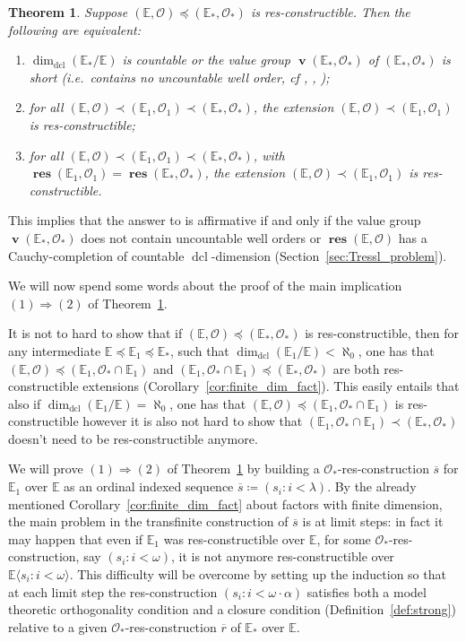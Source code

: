 \documentclass{amsart}
\theoremstyle{remark}
\theoremstyle{definition}
\theoremstyle{plain}
\newcommand{\bE}{\mathbb E}
\newcommand{\cO}{\mathcal O}
\DeclareMathOperator{\val}{\mathbf{v}}
\DeclareMathOperator{\res}{\mathbf{res}}
\DeclareMathOperator{\dcl}{\mathrm{dcl}}
\theoremstyle{plain}
\newcounter{introthmcounter}
\newtheorem{thmA}{Theorem}[introthmcounter]
\begin{document}
\begin{thmA}\label{introthm:Main}
    Suppose $(\bE, \cO)\preceq (\bE_*, \cO_*)$ is res-constructible. Then the following are equivalent:
    \begin{enumerate}
        \item $\dim_{\dcl}(\bE_*/\bE)$ is countable or the value group $\val(\bE_*, \cO_*)$ of $(\bE_*, \cO_*)$ is short (i.e.\ contains no uncountable well order, cf \cite[p.~88]{rosenstein1982linear}, \cite{aschenbrenner2025analytic}, \cite{aschenbrenner2025short});
        \item for all $(\bE, \cO) \prec (\bE_1, \cO_1) \prec (\bE_*, \cO_*)$, the extension $(\bE, \cO) \prec (\bE_1, \cO_1)$ is res-constructible;
        \item for all $(\bE, \cO) \prec (\bE_1, \cO_1) \prec (\bE_*, \cO_*)$, with $\res(\bE_1, \cO_1)=\res(\bE_*, \cO_*)$, the extension $(\bE, \cO) \prec (\bE_1, \cO_1)$ is res-constructible.
    \end{enumerate}

\end{thmA}

This implies that the answer to \cite[Problem~5.12]{tressl2006pseudo} is affirmative if and only if the value group $\val(\bE_*, \cO_*)$ does not contain uncountable well orders or $\res(\bE, \cO)$ has a Cauchy-completion of countable $\dcl$-dimension (Section~\ref{sec:Tressl_problem}).

We will now spend some words about the proof of the main implication $(1) \Rightarrow (2)$ of Theorem~\ref{introthm:Main}.

It is not to hard to show that if $(\bE, \cO) \preceq (\bE_*, \cO_*)$ is res-constructible, then for any intermediate $\bE \preceq \bE_1 \preceq \bE_*$, such that $\dim_{\dcl}(\bE_1/\bE)< \aleph_0$, one has that $(\bE, \cO) \preceq (\bE_1, \cO_* \cap \bE_1)$ and $(\bE_1, \cO_* \cap \bE_1) \preceq (\bE_*, \cO_*)$ are both res-constructible extensions (Corollary~\ref{cor:finite_dim_fact}). 
This easily entails that also if $\dim_{\dcl}(\bE_1/\bE)= \aleph_0$, one has that $(\bE, \cO) \preceq (\bE_1, \cO_* \cap \bE_1)$ is res-constructible however it is also not hard to show that $(\bE_1, \cO_* \cap \bE_1) \prec (\bE_*, \cO_*)$ doesn't need to be res-constructible anymore.

We will prove $(1) \Rightarrow (2)$ of Theorem~\ref{introthm:Main} by building a $\cO_*$-res-construction $\overline{s}$ for $\bE_1$ over $\bE$ as an ordinal indexed sequence $\overline{s}\coloneqq (s_i :i <\lambda)$. By the already mentioned Corollary~\ref{cor:finite_dim_fact} about factors with finite dimension, the main problem in the transfinite construction of $\overline{s}$ is at limit steps: in fact it may happen that even if $\bE_1$ was res-constructible over $\bE$, for some $\cO_*$-res-construction, say $(s_i: i < \omega)$, it is not anymore res-constructible over $\bE \langle s_i: i< \omega\rangle$. This difficulty will be overcome by setting up the induction so that at each limit step the res-construction $(s_i: i< \omega \cdot \alpha)$ satisfies both a model theoretic orthogonality condition and a closure condition (Definition~\ref{def:strong}) relative to a given $\cO_*$-res-construction $\overline{r}$ of $\bE_*$ over $\bE$.
\end{document}
